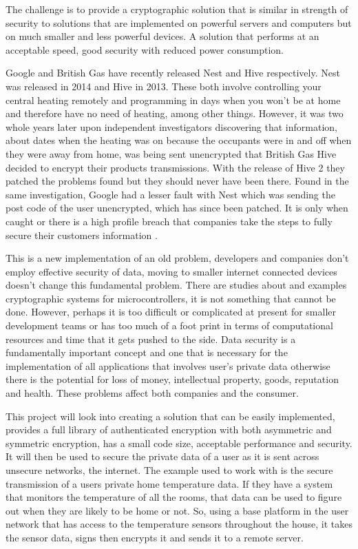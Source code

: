 	The challenge is to provide a cryptographic solution that is similar in strength of security to solutions that are implemented on powerful servers and computers but on much smaller and less powerful devices. A solution that performs at an acceptable speed, good security with reduced power consumption.
	
	Google and British Gas have recently released Nest and Hive respectively. Nest was released in 2014 and Hive in 2013. These both involve controlling your central heating remotely and programming in days when you won't be at home and therefore have no need of heating, among other things. However, it was two whole years later upon independent investigators discovering that information, about dates when the heating was on because the occupants were in and off when they were away from home, was being sent unencrypted that British Gas Hive decided to encrypt their products transmissions. With the release of Hive 2 they patched the problems found but they should never have been there. Found in the same investigation, Google had a lesser fault with Nest which was sending the post code of the user unencrypted, which has since been patched. It is only when caught or there is a high profile breach that companies take the steps to fully secure their customers information \cite{which}. 
	
	This is a new implementation of an old problem, developers and companies don't employ effective security of data, moving to smaller internet connected devices doesn't change this fundamental problem. There are studies about and examples cryptographic systems for microcontrollers, it is not something that cannot be done. However, perhaps it is too difficult or complicated at present for smaller development teams or has too much of a foot print in terms of computational resources and time that it gets pushed to the side. Data security is a fundamentally important concept and one that is necessary for the implementation of all applications that involves user's private data otherwise there is the potential for loss of money, intellectual property, goods, reputation and health. These problems affect both companies and the consumer.
	
	This project will look into creating a solution that can be easily implemented, provides a full library of authenticated encryption with both asymmetric and symmetric encryption, has a small code size, acceptable performance and security. It will then be used to secure the private data of a user as it is sent across unsecure networks, the internet. The example used to work with is the secure transmission of a users private home temperature data. If they have a system that monitors the temperature of all the rooms, that data can be used to figure out when they are likely to be home or not. So, using a base platform in the user network that has access to the temperature sensors throughout the house, it takes the sensor data, signs then encrypts it and sends it to a remote server. 
	
	
	